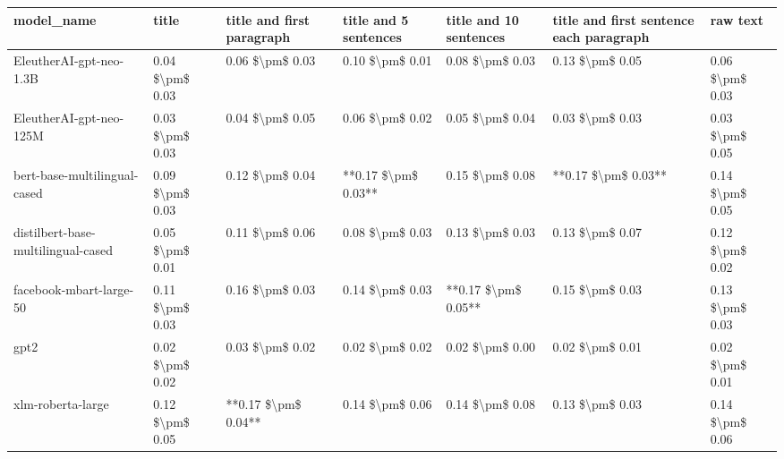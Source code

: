 \begin{tabular}{lllllll}
\toprule
                        model\_name &           title & title and first paragraph & title and 5 sentences & title and 10 sentences & title and first sentence each paragraph &        raw text \\
\midrule
           EleutherAI-gpt-neo-1.3B & 0.04 \$\textbackslash pm\$ 0.03 &           0.06 \$\textbackslash pm\$ 0.03 &       0.10 \$\textbackslash pm\$ 0.01 &        0.08 \$\textbackslash pm\$ 0.03 &                         0.13 \$\textbackslash pm\$ 0.05 & 0.06 \$\textbackslash pm\$ 0.03 \\
           EleutherAI-gpt-neo-125M & 0.03 \$\textbackslash pm\$ 0.03 &           0.04 \$\textbackslash pm\$ 0.05 &       0.06 \$\textbackslash pm\$ 0.02 &        0.05 \$\textbackslash pm\$ 0.04 &                         0.03 \$\textbackslash pm\$ 0.03 & 0.03 \$\textbackslash pm\$ 0.05 \\
      bert-base-multilingual-cased & 0.09 \$\textbackslash pm\$ 0.03 &           0.12 \$\textbackslash pm\$ 0.04 &   **0.17 \$\textbackslash pm\$ 0.03** &        0.15 \$\textbackslash pm\$ 0.08 &                     **0.17 \$\textbackslash pm\$ 0.03** & 0.14 \$\textbackslash pm\$ 0.05 \\
distilbert-base-multilingual-cased & 0.05 \$\textbackslash pm\$ 0.01 &           0.11 \$\textbackslash pm\$ 0.06 &       0.08 \$\textbackslash pm\$ 0.03 &        0.13 \$\textbackslash pm\$ 0.03 &                         0.13 \$\textbackslash pm\$ 0.07 & 0.12 \$\textbackslash pm\$ 0.02 \\
           facebook-mbart-large-50 & 0.11 \$\textbackslash pm\$ 0.03 &           0.16 \$\textbackslash pm\$ 0.03 &       0.14 \$\textbackslash pm\$ 0.03 &    **0.17 \$\textbackslash pm\$ 0.05** &                         0.15 \$\textbackslash pm\$ 0.03 & 0.13 \$\textbackslash pm\$ 0.03 \\
                              gpt2 & 0.02 \$\textbackslash pm\$ 0.02 &           0.03 \$\textbackslash pm\$ 0.02 &       0.02 \$\textbackslash pm\$ 0.02 &        0.02 \$\textbackslash pm\$ 0.00 &                         0.02 \$\textbackslash pm\$ 0.01 & 0.02 \$\textbackslash pm\$ 0.01 \\
                 xlm-roberta-large & 0.12 \$\textbackslash pm\$ 0.05 &       **0.17 \$\textbackslash pm\$ 0.04** &       0.14 \$\textbackslash pm\$ 0.06 &        0.14 \$\textbackslash pm\$ 0.08 &                         0.13 \$\textbackslash pm\$ 0.03 & 0.14 \$\textbackslash pm\$ 0.06 \\
\bottomrule
\end{tabular}
